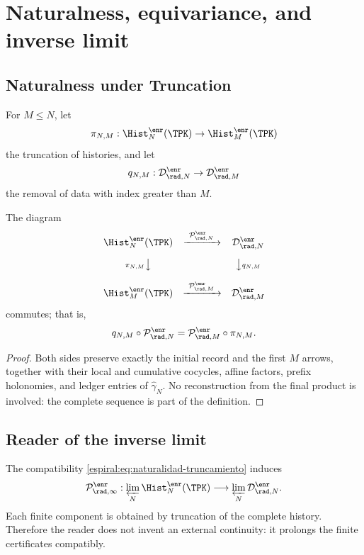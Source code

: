 \chapter{Naturalness, equivariance, and inverse limit}

\section{Naturalness under Truncation}

For \(M\le N\), let
\[
 \pi_{N,M}:\Hist_N^{\enr}(\TPK)\to\Hist_M^{\enr}(\TPK)
\]
the truncation of histories, and let
\[
 q_{N,M}:\mathcal D_{\rad,N}^{\enr}\to
 \mathcal D_{\rad,M}^{\enr}
\]
the removal of data with index greater than \(M\).

\begin{theorem}
The diagram
\[
\begin{array}{ccc}
\Hist_N^{\enr}(\TPK)
 & \xrightarrow{\ \mathcal P_{\rad,N}^{\enr}\ }
 & \mathcal D_{\rad,N}^{\enr}\\[1.0em]
{\scriptstyle \pi_{N,M}}\big\downarrow
 && \big\downarrow{\scriptstyle q_{N,M}}\\[1.0em]
\Hist_M^{\enr}(\TPK)
 & \xrightarrow{\ \mathcal P_{\rad,M}^{\enr}\ }
 & \mathcal D_{\rad,M}^{\enr}
\end{array}
\]
commutes; that is,
\begin{equation}
 q_{N,M}\circ\mathcal P_{\rad,N}^{\enr}
 =\mathcal P_{\rad,M}^{\enr}\circ\pi_{N,M}.
 \label{espiral:eq:naturalidad-truncamiento}
\end{equation}
\end{theorem}
\begin{proof}
Both sides preserve exactly the initial record and the first
\(M\) arrows, together with their local and cumulative cocycles, affine factors,
prefix holonomies, and ledger entries of \(\widehat\gamma_N\). No
reconstruction from the final product is involved: the complete sequence
is part of the definition.
\end{proof}

\section{Reader of the inverse limit}

The compatibility \cref{espiral:eq:naturalidad-truncamiento} induces
\begin{equation}
 \mathcal P_{\rad,\infty}^{\enr}:
 \varprojlim_N\Hist_N^{\enr}(\TPK)
 \longrightarrow
 \varprojlim_N\mathcal D_{\rad,N}^{\enr}.
 \label{espiral:eq:lector-limite-inverso}
\end{equation}
Each finite component is obtained by truncation of the complete history.
Therefore the reader does not invent an external continuity: it prolongs the finite
certificates compatibly.

